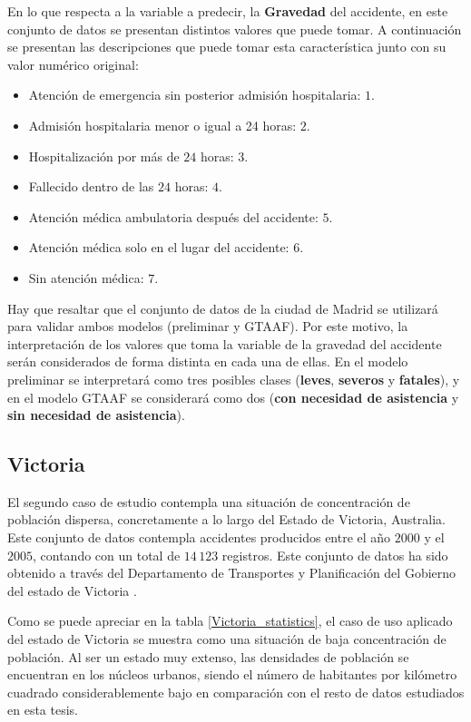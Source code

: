 En lo que respecta a la variable a predecir, la \textbf{Gravedad} del accidente, en este conjunto de datos se presentan distintos valores que puede tomar. A continuación se presentan las descripciones que puede tomar esta característica junto con su valor numérico original:

\begin{itemize}
	\item Atención de emergencia sin posterior admisión hospitalaria: $1$.
	\item Admisión hospitalaria menor o igual a 24 horas: $2$.
	\item Hospitalización por más de $24$ horas: $3$.
	\item Fallecido dentro de las $24$ horas: $4$.
	\item Atención médica ambulatoria después del accidente: $5$.
	\item Atención médica solo en el lugar del accidente: $6$.
	\item Sin atención médica: $7$.
\end{itemize}

Hay que resaltar que el conjunto de datos de la ciudad de Madrid se utilizará para validar ambos modelos (preliminar y GTAAF). Por este motivo, la interpretación de los valores que toma la variable de la gravedad del accidente serán considerados de forma distinta en cada una de ellas. En el modelo preliminar se interpretará como tres posibles clases (\textbf{leves}, \textbf{severos} y \textbf{fatales}), y  en el modelo GTAAF se considerará como dos (\textbf{con necesidad de asistencia} y \textbf{sin necesidad de asistencia}).


\subsection*{Victoria}

El segundo caso de estudio contempla una situación de concentración de población dispersa, concretamente a lo largo del Estado de Victoria, Australia. Este conjunto de datos contempla accidentes producidos entre el año $2000$ y el $2005$, contando con un total de $14\,123$ registros. Este conjunto de datos ha sido obtenido a través del Departamento de Transportes y Planificación del Gobierno del estado de Victoria \cite{InfoDatasetVictoria}.

Como se puede apreciar en la tabla \ref{Victoria_statistics}, el caso de uso aplicado del estado de Victoria se muestra como una situación de baja concentración de población. Al ser un estado muy extenso, las densidades de población se encuentran en los núcleos urbanos, siendo el número de habitantes por kilómetro cuadrado considerablemente bajo en comparación con el resto de datos estudiados en esta tesis.

